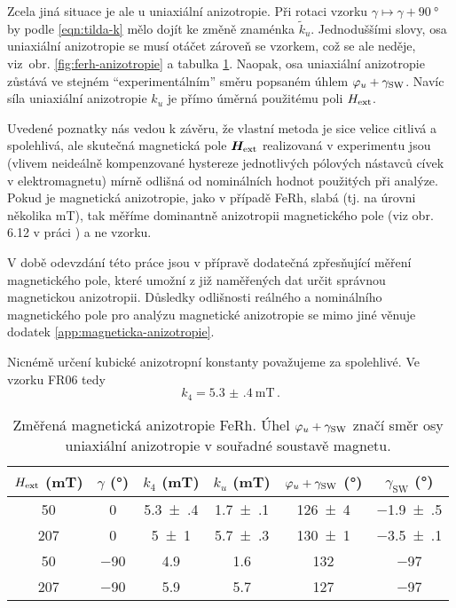 Zcela jiná situace je ale u uniaxiální anizotropie.
Při rotaci vzorku $\gamma \mapsto\gamma+\SI{90}{\degree}$ by podle \eqref{eqn:tilda-k} mělo dojít ke změně znaménka $\tilde{k}_u$.
Jednoduššími slovy, osa uniaxiální anizotropie se musí otáčet zároveň se vzorkem, což se ale neděje, viz~obr. \ref{fig:ferh-anizotropie} a tabulka \ref{tab:ferh-anizotropie}.
Naopak, osa uniaxiální anizotropie zůstává ve stejném ``experimentálním'' směru popsaném úhlem $\varphi_u+\gamma_\textrm{SW}$.
Navíc síla uniaxiální anizotropie $k_u$ je přímo úměrná použitému poli $H_\textrm{ext}$.

Uvedené poznatky nás vedou k závěru, že vlastní metoda je sice velice citlivá a spolehlivá, ale skutečná magnetická pole $\bm{H}_\textrm{ext}$ realizovaná v experimentu jsou (vlivem neideálně kompenzované hystereze jednotlivých pólových nástavců cívek v elektromagnetu) mírně odlišná od nominálních hodnot použitých při analýze.
Pokud je magnetická anizotropie, jako v případě FeRh, slabá (tj. na úrovni několika \si{\milli\tesla}), tak měříme dominantně anizotropii magnetického pole (viz obr. 6.12 v práci \cite{kimakOptickaSpektroskopieAntiferomagnetu2019}) a ne vzorku.

V době odevzdání této práce jsou v přípravě dodatečná zpřesňující měření magnetického pole, které umožní z již naměřených dat určit správnou magnetickou anizotropii.
Důsledky odlišnosti reálného a nominálního magnetického pole pro analýzu magnetické anizotropie se mimo jiné věnuje dodatek \ref{app:magneticka-anizotropie}.

Nicnémě určení kubické anizotropní konstanty považujeme za spolehlivé.
Ve vzorku FR06 tedy
\begin{equation}
    k_4=\SI{5.3(4)}{\milli\tesla} \,.
\end{equation}

\begin{table}[tp]
    \centering
    \begin{tabular}{cc|cccc}
        \toprule
        $H_\textrm{ext}$ (\si{\milli\tesla}) & $\gamma$ (\si{\degree}) & $k_4$ (\si{\milli\tesla}) & $k_u$ (\si{\milli\tesla}) & $\varphi_u+\gamma_\textrm{SW}$ (\si{\degree}) & $\gamma_\textrm{SW}$ (\si{\degree}) \\ \midrule[\heavyrulewidth]
        50 & 0 & \num{5.3(4)} & \num{1.7(1)} & \num{126(4)} & \num{-1.9(5)} \\
        207 & 0 & \num{5(1)} & \num{5.7(3)} & \num{130(1)} & \num{-3.5(1)} \\ \midrule[\heavyrulewidth]
        50 & \num{-90} & \num{4.9} & \num{1.6} & \num{132} & \num{-97} \\
        207 & \num{-90} & \num{5.9} & \num{5.7} & \num{127} & \num{-97} \\
        \bottomrule 
    \end{tabular} 
    \caption{Změřená magnetická anizotropie FeRh. Úhel $\varphi_u+\gamma_\textrm{SW}$ značí směr osy uniaxiální anizotropie v souřadné soustavě magnetu.}
    \label{tab:ferh-anizotropie}
\end{table}


